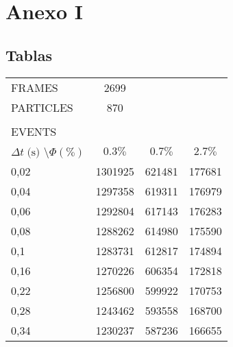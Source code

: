 \chapter{Anexo I}

\section{Tablas}

\begin{table}[H]
	\begin{tabular}{llll}
		\cline{1-2}
		\multicolumn{1}{|l|}{FRAMES} & \multicolumn{1}{c|}{2699} & & \\ \cline{1-2}
		\multicolumn{1}{|l|}{PARTICLES} & \multicolumn{1}{c|}{870} & & \\ \cline{1-2}
		&  &  &  \\ \cline{1-1}
		\multicolumn{1}{|l|}{EVENTS} &  &  &  \\ \hline
		\multicolumn{1}{|l|}{$\Delta t \; \textrm{(s)}$ \textbackslash $\Phi (\%)$} & \multicolumn{1}{c|}{$0.3\%$} & \multicolumn{1}{c|}{$0.7\%$} & \multicolumn{1}{c|}{$2.7\%$} \\ \hline
		\multicolumn{1}{|l|}{0,02} & \multicolumn{1}{c|}{1301925} & \multicolumn{1}{c|}{621481} & \multicolumn{1}{c|}{177681}\\ \hline
		\multicolumn{1}{|l|}{0,04} & \multicolumn{1}{c|}{1297358} & \multicolumn{1}{c|}{619311} & \multicolumn{1}{c|}{176979}\\ \hline
		\multicolumn{1}{|l|}{0,06} & \multicolumn{1}{c|}{1292804} & \multicolumn{1}{c|}{617143} & \multicolumn{1}{c|}{176283}\\ \hline
		\multicolumn{1}{|l|}{0,08} & \multicolumn{1}{c|}{1288262} & \multicolumn{1}{c|}{614980} & \multicolumn{1}{c|}{175590}\\ \hline
		\multicolumn{1}{|l|}{0,1} & \multicolumn{1}{c|}{1283731}  & \multicolumn{1}{c|}{612817} & \multicolumn{1}{c|}{174894}\\ \hline
		\multicolumn{1}{|l|}{0,16} & \multicolumn{1}{c|}{1270226} & \multicolumn{1}{c|}{606354} & \multicolumn{1}{c|}{172818}\\ \hline
		\multicolumn{1}{|l|}{0,22} & \multicolumn{1}{c|}{1256800} & \multicolumn{1}{c|}{599922} & \multicolumn{1}{c|}{170753}\\ \hline
		\multicolumn{1}{|l|}{0,28} & \multicolumn{1}{c|}{1243462} & \multicolumn{1}{c|}{593558} & \multicolumn{1}{c|}{168700}\\ \hline
		\multicolumn{1}{|l|}{0,34} & \multicolumn{1}{c|}{1230237} & \multicolumn{1}{c|}{587236} & \multicolumn{1}{c|}{166655}\\ \hline

\end{tabular}
\end{table}
